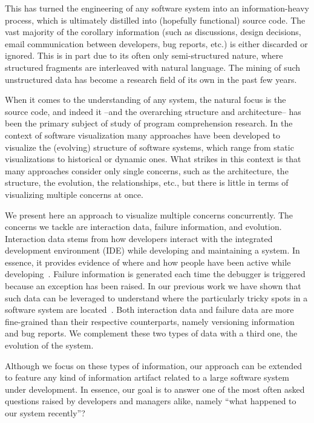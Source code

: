 This has turned the engineering of any software system into an information-heavy process, which is ultimately distilled into (hopefully functional) source code.
The vast majority of the corollary information (such as discussions, design decisions, email communication between developers, bug reports, etc.) is either discarded or ignored.
This is in part due to its often only semi-structured nature, where structured fragments are interleaved with natural language.
The mining of such unstructured data has become a research field of its own in the past few years.

When it comes to the understanding of any system, the natural focus is the source code, and indeed it --and the overarching structure and architecture-- has been the primary subject of study of program comprehension research.
In the context of software visualization many approaches have been developed to visualize the (evolving) structure of software systems, which range from static visualizations to historical or dynamic ones.
What strikes in this context is that many approaches consider only single concerns, such as the architecture, the structure, the evolution, the relationships, etc., but there is little in terms of visualizing multiple concerns at once.

We present here an approach to visualize multiple concerns concurrently.
The concerns we tackle are interaction data, failure information, and evolution.
Interaction data stems from how developers interact with the integrated development environment (IDE) while developing and maintaining a system.
In essence, it provides evidence of where and how people have been active while developing~\cite{Mine2015b}.
Failure information is generated each time the debugger is triggered because an exception has been raised.
In our previous work we have shown that such data can be leveraged to understand where the particularly tricky spots in a software system are located~\cite{DalS2015a}.
Both interaction data and failure data are more fine-grained than their respective counterparts, namely versioning information and bug reports.
We complement these two types of data with a third one, the evolution of the system.

Although we focus on these types of information, our approach can be extended to feature any kind of information artifact related to a large software system under development.
In essence, our goal is to answer one of the most often asked questions raised by developers and managers alike, namely ``what happened to our system recently''?~\cite{Sill2008}

